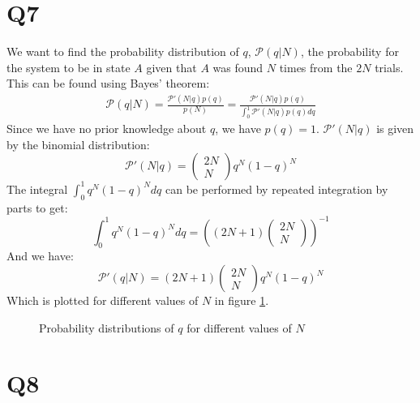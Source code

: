 \documentclass[12pt]{article}
\begin{document}
\section{Q7}
We want to find the probability distribution of $q$, $\mathcal{P}(q|N)$, the probability for the system to be in state $A$ given that $A$ was found $N$ times from the $2N$ trials.
This can be found using Bayes' theorem:
\begin{align}
	\mathcal{P}(q|N) = \frac{\mathcal{P}'(N|q)p(q)}{p(N)} = \frac{\mathcal{P}'(N|q)p(q)}{\int_0^1\mathcal{P}'(N|q)p(q)dq}
\end{align}
Since we have no prior knowledge about $q$, we have $p(q)=1$. $\mathcal{P}'(N|q)$ is given by the binomial distribution: 
\begin{equation}
	\mathcal{P}'(N|q)=\left(\begin{matrix}2N\\N\end{matrix}\right)q^N(1-q)^N
\end{equation}
The integral $\int_0^1q^N(1-q)^Ndq$ can be performed by repeated integration by parts to get:
\begin{equation}
	\int_0^1q^N(1-q)^Ndq = \left((2N+1)\left(\begin{matrix}2N\\N\end{matrix}\right)\right)^{-1}
\end{equation}
And we have:
\begin{equation}
	\mathcal{P}'(q|N) = (2N+1)\left(\begin{matrix}2N\\N\end{matrix}\right)q^N(1-q)^N
\end{equation}
Which is plotted for different values of $N$ in figure \ref{fig:bayes_prob_dists}.
\begin{figure}
\centering
\subfloat{
}\qquad
\caption{Probability distributions of $q$ for different values of $N$}
\label{fig:bayes_prob_dists}
\end{figure}
\section{Q8}
\end{document}
